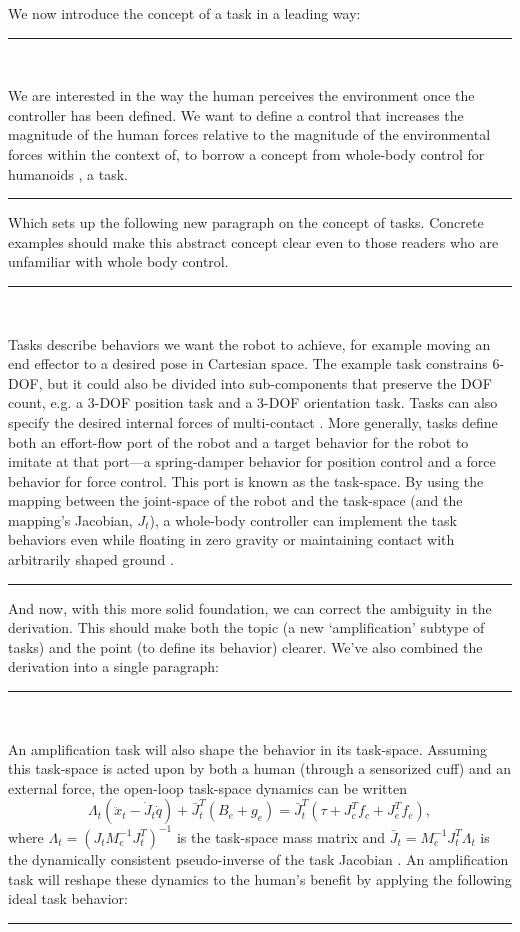 \documentclass[10pt,letterpaper]{letter}
\newcommand*{\ta}[1]{\textcolor[HTML]{107f10}{#1}}
\newcommand*{\ra}[1]{}
\newcommand{\response}[1]{\par{\hfill\begin{minipage}{\dimexpr\textwidth-2cm} #1\end{minipage}}}
\newcommand{\paperquote}[1]{%
	\begin{center}
		
		\begin{minipage}{.8\textwidth}
			{\rule{\textwidth}{.5pt}}\vspace{.5em}\\
			\begin{minipage}{\textwidth}\setlength{\parindent}{2em}#1\end{minipage}
			\vspace{.5em}
			{\rule{\textwidth}{.5pt}}
		\end{minipage}%
	\end{center}
}
\begin{document}
\begin{letter}{}
{We now introduce the concept of a task in a leading way:}
\paperquote{
We are interested in the way the human perceives the environment once the controller has been defined\ra{---we}\ta{. We} want to define a control \ta{that} increases the magnitude of the human forces relative to the magnitude of the environmental forces within the context \ra{of the task}\ta{of, to borrow a concept from whole-body control for humanoids \cite{SentisParkKhatib2010TRO},} a task.
}
\response{Which sets up the following new paragraph on the concept of tasks. Concrete examples should make this abstract concept clear even to those readers who are unfamiliar with whole body control.}	
\paperquote{
\ta{Tasks describe behaviors we want the robot to achieve, for example moving an end effector to a desired pose in Cartesian space. The example task constrains 6-DOF, but it could also be divided into sub-components that preserve the DOF count, e.g. a 3-DOF position task and a 3-DOF orientation task.
	Tasks can also specify the desired internal forces of multi-contact \cite{KimEA2016TRO}.
	More generally, tasks define both an effort-flow port of the robot and a target behavior for the robot to imitate at that port---a spring-damper behavior for position control and a force behavior for force control. This port is known as the task-space. By using the mapping between the joint-space of the robot and the task-space (and the mapping's Jacobian, $J_t$), a whole-body controller can implement the task behaviors even while floating in zero gravity or maintaining contact with arbitrarily shaped ground \cite{SentisParkKhatib2010TRO}. 
}
}
\response{And now, with this more solid foundation, we can correct the ambiguity in the derivation. This should make both the topic (a new `amplification' subtype of tasks) and the point (to define its behavior) clearer. We've also combined the derivation into a single paragraph:}
\paperquote{
\ra{Looking at the task-space,}\ta{An amplification task will also shape the behavior in its task-space. Assuming this task-space is acted upon by both a human (through a sensorized cuff) and an external force, the open-loop task-space dynamics can be written}
\begin{equation}
\Lambda_t (\ddot x_t - \dot{J}_t \dot q) + \bar{J}_t^T (B_e + g_e) = \bar{J}_t^T(\tau +J_c^T f_c + J_e^T f_e),
\end{equation}
where $\Lambda_t = (J_t M_e^{-1} J_t^T)^{-1}$ is the \ra{operational }\ta{task-}space mass matrix and $\bar{J}_t = M_e^{-1} J_t^T\Lambda_t$ is the dynamically consistent pseudo-inverse of the task Jacobian \ta{\cite{KimEA2016TRO}}. \ta{An amplification task will reshape these dynamics to the human's benefit by applying the following ideal task behavior:}
}
\end{letter}
\end{document}
